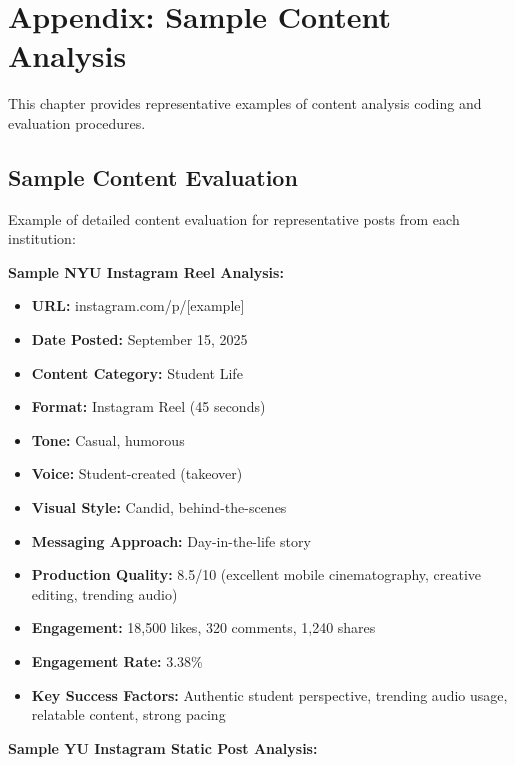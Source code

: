 \documentclass[12pt]{report}
\begin{document}
\chapter{Appendix: Sample Content Analysis}

This chapter provides representative examples of content analysis coding and evaluation procedures.

\section{Sample Content Evaluation}

Example of detailed content evaluation for representative posts from each institution:

\textbf{Sample NYU Instagram Reel Analysis:}

\begin{itemize}
\item \textbf{URL:} instagram.com/p/[example]
\item \textbf{Date Posted:} September 15, 2025
\item \textbf{Content Category:} Student Life
\item \textbf{Format:} Instagram Reel (45 seconds)
\item \textbf{Tone:} Casual, humorous
\item \textbf{Voice:} Student-created (takeover)
\item \textbf{Visual Style:} Candid, behind-the-scenes
\item \textbf{Messaging Approach:} Day-in-the-life story
\item \textbf{Production Quality:} 8.5/10 (excellent mobile cinematography, creative editing, trending audio)
\item \textbf{Engagement:} 18,500 likes, 320 comments, 1,240 shares
\item \textbf{Engagement Rate:} 3.38\%
\item \textbf{Key Success Factors:} Authentic student perspective, trending audio usage, relatable content, strong pacing
\end{itemize}

\textbf{Sample YU Instagram Static Post Analysis:}
\end{document}
